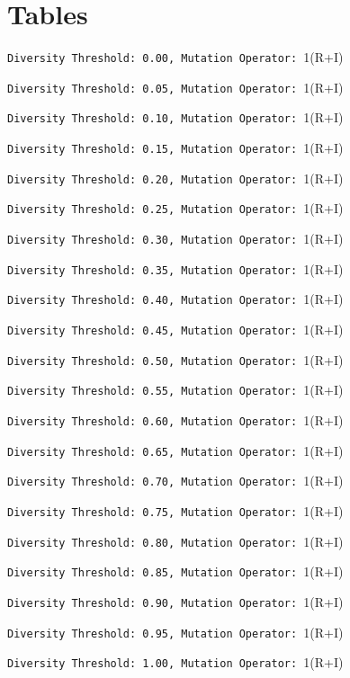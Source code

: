 \documentclass{article}
\begin{document}
\section{Tables}
\verb|Diversity Threshold: 0.00, Mutation Operator: |1(R+I)

\newpage
\verb|Diversity Threshold: 0.05, Mutation Operator: |1(R+I)

\newpage
\verb|Diversity Threshold: 0.10, Mutation Operator: |1(R+I)

\newpage
\verb|Diversity Threshold: 0.15, Mutation Operator: |1(R+I)

\newpage
\verb|Diversity Threshold: 0.20, Mutation Operator: |1(R+I)

\newpage
\verb|Diversity Threshold: 0.25, Mutation Operator: |1(R+I)

\newpage
\verb|Diversity Threshold: 0.30, Mutation Operator: |1(R+I)

\newpage
\verb|Diversity Threshold: 0.35, Mutation Operator: |1(R+I)

\newpage
\verb|Diversity Threshold: 0.40, Mutation Operator: |1(R+I)

\newpage
\verb|Diversity Threshold: 0.45, Mutation Operator: |1(R+I)

\newpage
\verb|Diversity Threshold: 0.50, Mutation Operator: |1(R+I)

\newpage
\verb|Diversity Threshold: 0.55, Mutation Operator: |1(R+I)

\newpage
\verb|Diversity Threshold: 0.60, Mutation Operator: |1(R+I)

\newpage
\verb|Diversity Threshold: 0.65, Mutation Operator: |1(R+I)

\newpage
\verb|Diversity Threshold: 0.70, Mutation Operator: |1(R+I)

\newpage
\verb|Diversity Threshold: 0.75, Mutation Operator: |1(R+I)

\newpage
\verb|Diversity Threshold: 0.80, Mutation Operator: |1(R+I)

\newpage
\verb|Diversity Threshold: 0.85, Mutation Operator: |1(R+I)

\newpage
\verb|Diversity Threshold: 0.90, Mutation Operator: |1(R+I)

\newpage
\verb|Diversity Threshold: 0.95, Mutation Operator: |1(R+I)

\newpage
\verb|Diversity Threshold: 1.00, Mutation Operator: |1(R+I)

\end{document}
